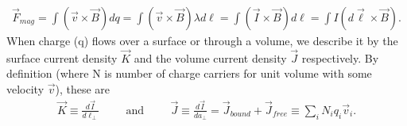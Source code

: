 \begin{align}
	\vec{F}_{mag} = \int (\vec{v}\times \vec{B})dq = \int (\vec{v}\times \vec{B})\lambda d\ell = \int (\vec{I}\times \vec{B})d\ell = \int I (d\vec{\ell}\times \vec{B}).
\end{align} 
When charge (q) flows over a surface or through a volume, we describe it by the surface current density $\vec{K}$ and the volume current density $\vec{J}$ respectively. By definition (where N is number of charge carriers for unit volume with some velocity $\vec{v}$), these are
\begin{align}
	\vec{K} \equiv \frac{d\vec{I}}{d\ell_\perp} \hspace{1cm}\textrm{and}\hspace{1cm}\vec{J}\equiv \frac{d\vec{I}}{da_\perp} = \vec{J}_{bound}+\vec{J}_{free} \equiv \sum_{i}N_iq_i\vec{v}_i.
\end{align}
